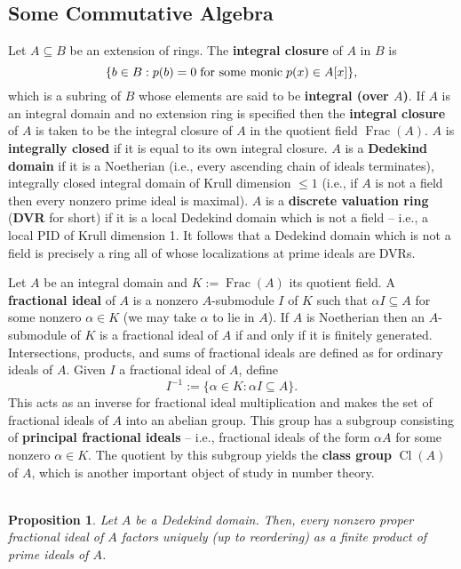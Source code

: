 \documentclass[11pt]{article}
\DeclareMathOperator{\Cl}{Cl}
\DeclareMathOperator{\Frac}{Frac}
\renewcommand{\subset}{\subseteq}
\newtheorem*{proposition*}{\\Proposition}
\begin{document}
\subsection{Some Commutative Algebra}
Let $A\subset B$ be an extension of rings. The \textbf{integral closure} of $A$ in $B$ is 
$$\{b\in B : p(b)=0\textrm{\;for some monic\;}p(x)\in A[x]\},$$
which is a subring of $B$ whose elements are said to be \textbf{integral (over $A$)}. If $A$ is an integral domain and no extension ring is specified then the \textbf{integral closure} of $A$ is taken to be the integral closure of $A$ in the quotient field $\Frac(A)$. $A$ is \textbf{integrally closed} if it is equal to its own integral closure. $A$ is a \textbf{Dedekind domain} if it is a Noetherian (i.e., every ascending chain of ideals terminates), integrally closed integral domain of Krull dimension $\leq1$ (i.e., if $A$ is not a field then every nonzero prime ideal is maximal). $A$ is a \textbf{discrete valuation ring} (\textbf{DVR} for short) if it is a local Dedekind domain which is not a field -- i.e., a local PID of Krull dimension 1. It follows that a Dedekind domain which is not a field is precisely a ring all of whose localizations at prime ideals are DVRs.

Let $A$ be an integral domain and $K:=\Frac(A)$ its quotient field. A \textbf{fractional ideal} of $A$ is a nonzero $A$-submodule $I$ of $K$ such that $\alpha I\subset A$ for some nonzero $\alpha\in K$ (we may take $\alpha$ to lie in $A$). If $A$ is Noetherian then an $A$-submodule of $K$ is a fractional ideal of $A$ if and only if it is finitely generated. Intersections, products, and sums of fractional ideals are defined as for ordinary ideals of $A$. Given $I$ a fractional ideal of $A$, define
$$I^{-1}:=\{\alpha\in K : \alpha I\subset A\}.$$
This acts as an inverse for fractional ideal multiplication and makes the set of fractional ideals of $A$ into an abelian group. This group has a subgroup consisting of \textbf{principal fractional ideals} -- i.e., fractional ideals of the form $\alpha A$ for some nonzero $\alpha\in K$. The quotient by this subgroup yields the \textbf{class group} $\Cl(A)$ of $A$, which is another important object of study in number theory. 

\begin{proposition*}
Let $A$ be a Dedekind domain. Then, every nonzero proper fractional ideal of $A$ factors uniquely (up to reordering) as a finite product of prime ideals of $A$.
\end{proposition*}
\end{document}
